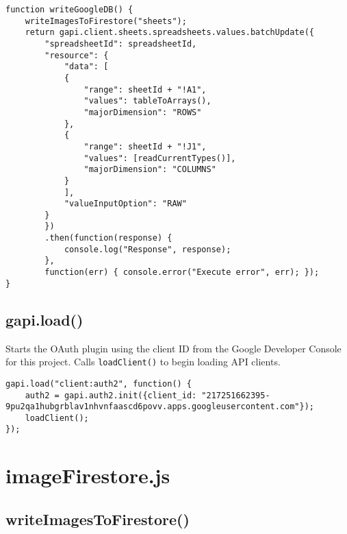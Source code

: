 \documentclass[letterpaper]{article}
\begin{document}
\begin{lstlisting}[firstnumber=194]
function writeGoogleDB() {
    writeImagesToFirestore("sheets");
    return gapi.client.sheets.spreadsheets.values.batchUpdate({
        "spreadsheetId": spreadsheetId,
        "resource": {
            "data": [
            {
                "range": sheetId + "!A1",
                "values": tableToArrays(),
                "majorDimension": "ROWS"
            },
            {
                "range": sheetId + "!J1",
                "values": [readCurrentTypes()],
                "majorDimension": "COLUMNS"
            }
            ],
            "valueInputOption": "RAW"
        }
        })
        .then(function(response) {
            console.log("Response", response);
        },
        function(err) { console.error("Execute error", err); });
}
\end{lstlisting}

\subsection{gapi.load()}

Starts the OAuth plugin using the client ID from the Google Developer Console for this project.
Calls \lstinline{loadClient()} to begin loading API clients.

\begin{lstlisting}[firstnumber=220]
gapi.load("client:auth2", function() {
    auth2 = gapi.auth2.init({client_id: "217251662395-9pu2qa1hubgrblav1nhvnfaascd6povv.apps.googleusercontent.com"});
    loadClient();
});
\end{lstlisting}

\newpage

\section{imageFirestore.js}

\subsection{writeImagesToFirestore()}
\end{document}

